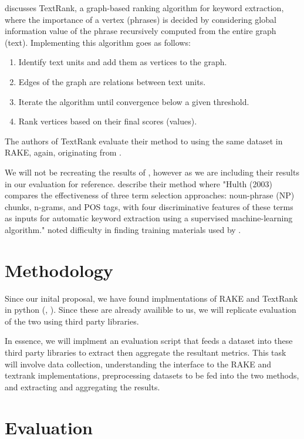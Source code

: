 \documentclass[11pt,a4paper]{article}
\begin{document}
\citet{4} discusses TextRank, a graph-based ranking algorithm for keyword extraction, where the importance of a vertex (phrases) is decided by considering global information value of the phrase recursively computed from the entire graph (text). Implementing this algorithm goes as follows:

\begin{enumerate}
\item Identify text units and add them as vertices to the graph.
\item Edges of the graph are relations between text units.
\item Iterate the algorithm until convergence below a given threshold. 
\item Rank vertices based on their final scores (values).
\end{enumerate}   

The authors of TextRank evaluate their method to \citet{hulth-2003-improved} using the same dataset in RAKE, again, originating from \citet{hulth-2003-improved}.

We will not be recreating the results of \citet{hulth-2003-improved}, however as we are including their results in our evaluation for reference. \citet{1} describe their method where "Hulth (2003) compares the effectiveness of three term selection approaches: noun-phrase (NP) chunks, n-grams, and POS tags, with four discriminative features of these terms as inputs for automatic keyword extraction using a supervised machine-learning algorithm." \citet{1} noted difficulty in finding training materials used by \citet{hulth-2003-improved}.    

\section{Methodology}

Since our inital proposal, we have found implmentations of RAKE and TextRank in python (\citet{2}, \citet{3}). Since these are already availible to us, we will replicate  evaluation of the two using third party libraries. 

In essence, we will implment an evaluation script that feeds a dataset into these third party libraries to extract then aggregate the resultant metrics. This task will involve data collection, understanding the interface to the RAKE and textrank implementations, preprocessing datasets to be fed into the two methods, and extracting and aggregating the results.

\section{Evaluation}
\end{document}
